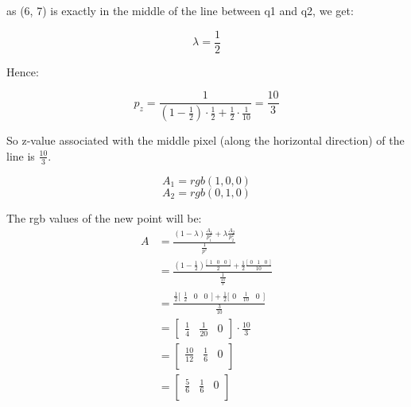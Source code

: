 \documentclass{article}
\begin{document}
as (6, 7) is exactly in the middle of the line between q1 and q2, we get:

\[
    \lambda = \frac{1}{2}
\]

Hence:

\[
    p_z = \frac{1}{(1 - \frac{1}{2}) \cdot \frac{1}{2} + \frac{1}{2} \cdot \frac{1}{10}} = \frac{10}{3}
\]

So z-value associated with the middle pixel (along the horizontal direction) of the line is $\frac{10}{3}$.

\[
    A_1 = rgb(1, 0, 0)
\]
\[
    A_2 = rgb(0, 1, 0)
\]

The rgb values of the new point will be:
\begin{align*}
    A & = \frac { (1-\lambda) \frac{A_1}{p^z_1} + \lambda \frac{A_2}{p^z_2}}
    {\frac{1}{p^{z}}}                                                        \\
      & = \frac { (1-\frac{1}{2}) \frac{
            \bigl[\begin{smallmatrix}
                          1 & 0 & 0
                      \end{smallmatrix}\bigr]
        }{2} + \frac{1}{2} \frac{
            \bigl[\begin{smallmatrix}
                          0 & 1 & 0
                      \end{smallmatrix}\bigr]
        }{10}}
    {\frac{1}{\frac{10}{3}}}                                                 \\
      & = \frac { \frac{1}{2}
        \bigl[\begin{smallmatrix}
                      \frac{1}{2} & 0 & 0
                  \end{smallmatrix}\bigr]
        + \frac{1}{2}
        \bigl[\begin{smallmatrix}
                      0 & \frac{1}{10} & 0
                  \end{smallmatrix}\bigr]
    }
    {\frac{3}{10}}                                                           \\
      & = \begin{bmatrix}
              \frac{1}{4} & \frac{1}{20} & 0
          \end{bmatrix}
    \cdot \frac{10}{3}                                                       \\
      & = \begin{bmatrix}
              \frac{10}{12} & \frac{1}{6} & 0 \\
          \end{bmatrix}                                    \\
      & = \begin{bmatrix}
              \frac{5}{6} & \frac{1}{6} & 0 \\
          \end{bmatrix}
\end{align*}
\end{document}

